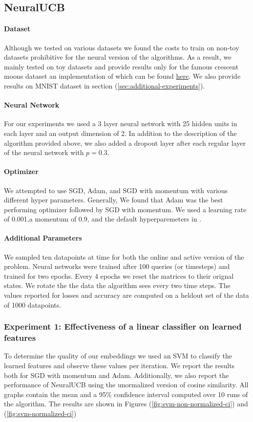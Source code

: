 \documentclass{article}
\begin{document}
\subsection{NeuralUCB}
\paragraph{Dataset}
Although we tested on various datasets we found the costs to train on non-toy datasets prohibitive for the neural version of the algorithms.
As a result, we mainly tested on toy datasets and provide results only for the famous crescent moons dataset an implementation of which can
be found
\href{https://scikit-learn.org/stable/modules/generated/sklearn.datasets.make_moons.html}{here}.
We also provide results on MNIST dataset in section (\ref{sec:additional-experiments}).

\paragraph{Neural Network}
For our experiments we used a 3 layer neural network with 25 hidden units in each layer and an output dimension of 2.
In addition to the description of the algorithm provided above, we also added a dropout layer after each regular layer of the neural network with
$p =0.3$.

\paragraph{Optimizer}
We attempted to use SGD, Adam, and SGD with momentum with various different hyper parameters.
Generally, We found that Adam was the best performing optimizer followed by SGD with momentum.
We used a learning rate of 0.001,a momentum of 0.9, and the default hyperparemeters in \cite{adam}.

\paragraph{Additional Parameters}
We sampled ten datapoints at time for both the online and active version of the problem. Neural networks were trained after 100 queries (or timesteps)
and trained for two epochs. Every 4 epochs we reset the matrices to their orignal states. We rotate the the data the algorithm sees every two time steps.
The values reported for losses and accuracy are computed on a heldout set of the data of 1000 datapoints.

\subsubsection{Experiment 1: Effectiveness of a linear classifier on learned features}
To determine the quality of our embeddings we used an SVM to classify the learned features and observe these values
per iteration. We report the results both for SGD with momentum and Adam. Additionally, we also report the performance of NeuralUCB
using the unormalized version of cosine similarity. All graphs contain the mean and a 95\% confidence interval
computed over 10 runs of the algorithm. The results are shown in Figures (\ref{fig:svm-non-normalized-ci}) and (\ref{fig:svm-normalized-ci})
\end{document}
